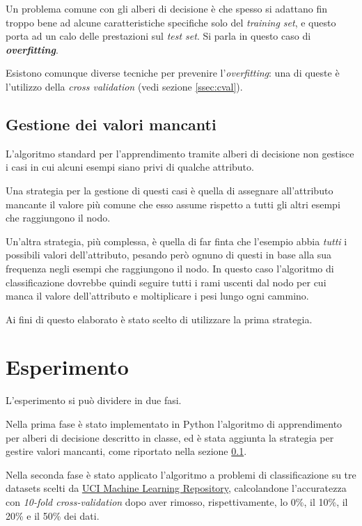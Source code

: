 \documentclass[a4paper,12pt]{article}
\begin{document}
Un problema comune con gli alberi di decisione è che spesso si adattano fin troppo bene ad alcune caratteristiche specifiche solo del \textit{training set}, e questo porta ad un calo delle prestazioni sul \textit{test set}. Si parla in questo caso di \textit{\textbf{overfitting}}.

Esistono comunque diverse tecniche per prevenire l'\textit{overfitting}: una di queste è l'utilizzo della \textit{cross validation} (vedi sezione \ref{ssec:cval}).

\subsection{Gestione dei valori mancanti} \label{ssec:val}
L'algoritmo standard per l'apprendimento tramite alberi di decisione non gestisce i casi in cui alcuni esempi
siano privi di qualche attributo.
\newline

Una strategia per la gestione di questi casi è quella di assegnare all'attributo mancante
il valore più comune che esso assume rispetto a tutti gli altri esempi che raggiungono il nodo.
\newline

Un'altra strategia, più complessa, è quella di far finta che l'esempio abbia \textit{tutti} i possibili valori
dell'attributo, pesando però ognuno di questi in base alla sua frequenza negli esempi che raggiungono il nodo.
In questo caso l'algoritmo di classificazione dovrebbe quindi seguire tutti i rami uscenti dal nodo per cui manca il valore
dell'attributo e moltiplicare i pesi lungo ogni cammino.
\newline

Ai fini di questo elaborato è stato scelto di utilizzare la prima strategia.

\section{Esperimento}
L'esperimento si può dividere in due fasi.
\newline

Nella prima fase è stato implementato in Python l’algoritmo di apprendimento per alberi di decisione descritto
in classe, ed è stata aggiunta la strategia per gestire valori mancanti, come riportato nella sezione
\ref{ssec:val}.
\newline

Nella seconda fase è stato applicato l'algoritmo a problemi di classificazione su tre datasets scelti
da \href{http://archive.ics.uci.edu/ml/index.php}{UCI Machine Learning Repository}, calcolandone l'accuratezza con \textit{10-fold cross-validation} dopo aver rimosso,
rispettivamente, lo 0\%, il 10\%, il 20\% e il 50\% dei dati.
\newline
\end{document}

